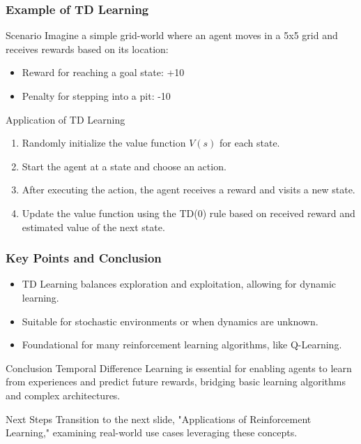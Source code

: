 \documentclass[aspectratio=169]{beamer}
\begin{document}
\begin{frame}[fragile]
  \frametitle{Example of TD Learning}
  \begin{block}{Scenario}
    Imagine a simple grid-world where an agent moves in a 5x5 grid and receives rewards based on its location:
    \begin{itemize}
      \item Reward for reaching a goal state: +10
      \item Penalty for stepping into a pit: -10
    \end{itemize}
  \end{block}
  
  \begin{block}{Application of TD Learning}
    \begin{enumerate}
      \item Randomly initialize the value function \( V(s) \) for each state.
      \item Start the agent at a state and choose an action.
      \item After executing the action, the agent receives a reward and visits a new state.
      \item Update the value function using the TD(0) rule based on received reward and estimated value of the next state.
    \end{enumerate}
  \end{block}
\end{frame}

\begin{frame}[fragile]
  \frametitle{Key Points and Conclusion}
  \begin{itemize}
    \item TD Learning balances exploration and exploitation, allowing for dynamic learning.
    \item Suitable for stochastic environments or when dynamics are unknown.
    \item Foundational for many reinforcement learning algorithms, like Q-Learning.
  \end{itemize}
  
  \begin{block}{Conclusion}
    Temporal Difference Learning is essential for enabling agents to learn from experiences and predict future rewards, bridging basic learning algorithms and complex architectures.
  \end{block}
    
  \begin{block}{Next Steps}
    Transition to the next slide, "Applications of Reinforcement Learning," examining real-world use cases leveraging these concepts.
  \end{block}
\end{frame}
\end{document}
